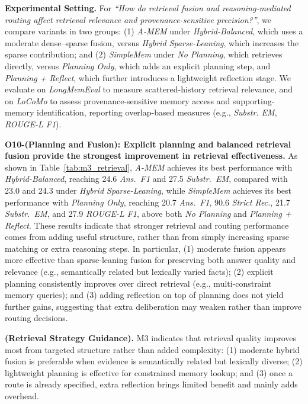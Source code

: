 \noindent \textbf{Experimental Setting.}
For \textit{``How do retrieval fusion and reasoning-mediated routing affect retrieval relevance and provenance-sensitive precision?''}, we compare variants in two groups:
(1) \textit{A-MEM} under \textit{Hybrid-Balanced}, which uses a moderate dense--sparse fusion, versus \textit{Hybrid Sparse-Leaning}, which increases the sparse contribution; and (2) \textit{SimpleMem} under \textit{No Planning}, which retrieves directly, versus \textit{Planning Only}, which adds an explicit planning step, and \textit{Planning + Reflect}, which further introduces a lightweight reflection stage.
We evaluate on \textit{LongMemEval} to measure scattered-history retrieval relevance, and on \textit{LoCoMo} to assess provenance-sensitive memory access and supporting-memory identification, reporting overlap-based measures (e.g., \textit{Substr. EM}, \textit{ROUGE-L F1}).

\noindent \textbf{O10-(Planning and Fusion): Explicit planning and balanced retrieval fusion provide the strongest improvement in retrieval effectiveness.}
As shown in Table~\ref{tab:m3_retrieval}, \textit{A-MEM} achieves its best performance with \textit{Hybrid-Balanced}, reaching 24.6 \textit{Ans.\ F1} and 27.5 \textit{Substr.\ EM}, compared with 23.0 and 24.3 under \textit{Hybrid Sparse-Leaning}, while \textit{SimpleMem} achieves its best performance with \textit{Planning Only}, reaching 20.7 \textit{Ans.\ F1}, 90.6 \textit{Strict Rec.}, 21.7 \textit{Substr.\ EM}, and 27.9 \textit{ROUGE-L F1}, above both \textit{No Planning} and \textit{Planning + Reflect}.
These results indicate that stronger retrieval and routing performance comes from adding useful structure, rather than from simply increasing sparse matching or extra reasoning steps.
In particular, (1) moderate fusion appears more effective than sparse-leaning fusion for preserving both answer quality and relevance (e.g., semantically related but lexically varied facts); (2) explicit planning consistently improves over direct retrieval (e.g., multi-constraint memory queries); and (3) adding reflection on top of planning does not yield further gains, suggesting that extra deliberation may weaken rather than improve routing decisions.

\begin{findingbox}
\textbf{(Retrieval Strategy Guidance).}
M3 indicates that retrieval quality improves most from targeted structure rather than added complexity:
(1) moderate hybrid fusion is preferable when evidence is semantically related but lexically diverse;
(2) lightweight planning is effective for constrained memory lookup;
and (3) once a route is already specified, extra reflection brings limited benefit and mainly adds overhead.
\end{findingbox}

